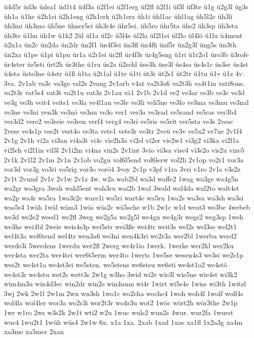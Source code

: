 {ü4d5r
üd3s
üdsa1
üd1t4
ü4f3a
ü2f1ei
ü2f1erg
üf2fl
ü2f1i
üf3l
üf3te
ü1g
ü2g3l
üg3s
üh1a
ü1he
ü2h1ei
ü2h1eng
ü2h1erk
ü2h1erz
üh1i
ühl1ac
ühl1ag
üh5l2e
üh3li
üh3mi
üh3mo
üh5ne
ühner5ei
üh3r4e
ühr5ei.
üh5ro
ühr5ta
ühs2
üh3sp
üh3stu
üh3te
ü1hu
üh1w
ü1k2
2ül
ül1a
ül2c
ü5l4e
ül2la
ül2l1ei
ül2lo
ül4lö
ü1lu
ü4ment
ü2n1a
ün2c
ün2da
ün2dr
ün2f1
ün4f3ei
ün3fl
ün4fli
ünf5r
ün2g3l
üng5s
ün3th
ün2za
ü1pe
ü1pi
ü1pu
ür1a
ü2r1ei
ür2fl
ür4f3r
ür4g5eng
ü1ri
ü1r2o1
üro3b
ü3rofe
ür4ster
ür5sti
ürt2h
ür3the
ü1ru
üs2a
ü2schl
üse3h
üse3l
üs4sa
üs4s1c
üs3se
üs4st
ü4sta
üste3ne
ü4str
ü1ß
ü1ta
ü2t1al
ü1te
ü1ti
üt3r
üt2s1
üt2tr
ü1tu
ü1v
ü1z
4v.
3va.
2v1ab
va3c
va3ge
val2s
2vang
2v1arb
v4at
va2t3a6
va2t3h
va4t1in
vati8ons.
va2t3r
vat5s4
vat3t
va2t1u
vat3z
2v1au
vä1
2v1b
2v1d
ve2
ve3ar
ve3b
ve3c
ve3d
ve3g
ve3h
veit4
veits1
ve3la
ve4l1au
ve3le
ve3li
veli5ne
ve3lo
ve3ma
ve3mu
ve3nal
ve3ne
ve3ni
ven3k
ve3nö
ve3nu
ve3o
ver1
ver3a
ve3rad
ve5rand
ve5ras
ver3b4
ver3d2
vere2
ve3reie
ve3ren
verf4
verg4
ve3ri
ve5ris
ve5rit
ver5sta
ve3s
2vesc
2vese
ve4s1p
ves2t
vest4o
ve3ta
vete1
vete3r
ve3tr
2veü
ve3v
ve5x2
ve7xe
2v1f4
2v1g
2v1h
vi2a
vi3an
vi4a3t
vi4c
vie2h3a
vi2el
vi2er
vie2w1
vi3g2
vi3ka
vi2l1a
vi2leh
vi2l1in
vil3l
2v1i2m
vi4na
vin2s
2v1int
3vio
vi3sa
vise4
vi3s2o
vis2u
vize5
2v1k
2v1l2
2v1m
2v1n
2v1ob
vo2gu
vol6l5end
vol6lerw
vol2li
2v1op
vo2r1
vor3a
vor3d
vor3g
vo3ri
vo5rig
vor3o
vorö4
3voy
2v1p
v3pf
v1ra
3vri
v1ro
2v1s
v3s2z
2v1t
2vumf
2v1v
2v1w
2v1z
4w.
w2a
wab2bl
wa3d
waffe2
1wag
wa3ge
wa4g5n
wa2gr
wa3gra
3wah
wahl5ent
wah3ru
wai2b
1wal
3wald
wal4da
wal2to
walt4st
wa2p
wa4r
wa5ra
1wa3r2e
ware1i
wa5ri
wart4e
wa5ru
1wa2s
wa3sa
wa3sh
wa3si
was5s4
1wäh
1wäl
wäm3
1wäs
wäs2c
wä5sche
w1b
2w1c
w1d
weat3
we3be
4webeb
we3d
we2e2
weed1
we2fl
3weg
we2g5a
we2g5l
we4gn
we4g3r
wegs2
weg3sp
1weh
we3he
wei4bl
2weie
weis4s3p
wei5str
wei3ße
wei4tr
weit3s
wel2s
wel3se
wel2t1
wel4t3a
wel6tend
wel4tr
wen3a6
we3ni
wen4k3ri
we2r3a
wer2bl
1werbu
werd2
werde3i
5werdens
1werdu
wer2fl
2werg
we4r1io
1werk.
1werke
wer2kl
wer2ku
wer4sta
wer2ta
wer4tei
wer6t5erm
wer4to
1werts
1we5se
wesen4s3
we3si
we2s1p
wes2t
we4st1a
we4st3ei
we5sten.
we5stens
we6steu
we6sti
we4st1o2
we4stö
we4st3r
we4stu
wet2s
wett3s
2w1g
w3ho
3wid
wi2e
wie3l
wie5ne
wie4st
wi3k2
wim4m3u
win4d3ec
win2dr
win2e
win4num
wi4r
1wirt
wi5s4e
1wiss
wi3th
1witzl
3wj
2wk
2w1l
2w1m
2wn
wn3sh
1wo1c
wo2cha
woche4
1woh
woh4l
1wolf
wolf4s
wol4la
wol4ler
wor3a
wo2r3i
wor2t3r
wo4r3u
wot2
1wöc
wört2h
wör3the
2w1p
1wr
w1ro
2ws
w3s2k
2w1t
wti2
w2u
1wuc
wuls2
wun2s
4wur.
wur2fa
1wurst
wus4
1wu2t1
1wüh
wüs4
2w1w
6x.
x1a
1xa.
2xab
1xad
1xae
xa1fl
1x2a3g
xa4m
xa3me
xa5mer
2xan
}
